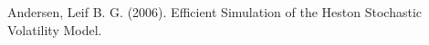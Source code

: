 \documentclass{ws-ijfe}
\begin{document}





\begin{thebibliography}{99}
Andersen, Leif B. G. (2006). Efficient Simulation of the Heston Stochastic Volatility Model.




\end{thebibliography}
\end{document}
